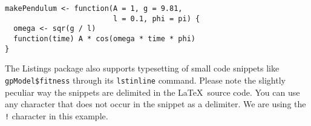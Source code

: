 \begin{lstlisting}[caption = {test}, label = lstExample]
makePendulum <- function(A = 1, g = 9.81,
                         l = 0.1, phi = pi) {
  omega <- sqr(g / l)
  function(time) A * cos(omega * time * phi)
}
\end{lstlisting}

The {\sf Listings} package also supports typesetting of small code snippets like
\lstinline!gpModel$fitness! through its {\tt lstinline} command. Please note the slightly peculiar way
the snippets are delimited in the \LaTeX~source code. You can use any character that does not occur
in the snippet as a delimiter. We are using the {\tt !} character in this example.
